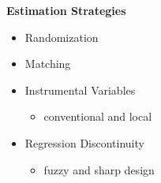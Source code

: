 \begin{frame}\textbf{Estimation Strategies}\vspace{0.3cm}
\begin{itemize}\setlength\itemsep{1em}
\item Randomization
\item Matching
\item Instrumental Variables\medskip
\begin{itemize}
\item conventional and local
\end{itemize}
\item Regression Discontinuity\medskip
\begin{itemize}
\item fuzzy and sharp design
\end{itemize}
\end{itemize}
\end{frame}
